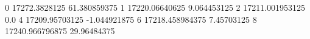 0 17272.3828125 61.380859375
1 17220.06640625 9.064453125
2 17211.001953125 0.0
4 17209.95703125 -1.044921875
6 17218.458984375 7.45703125
8 17240.966796875 29.96484375
